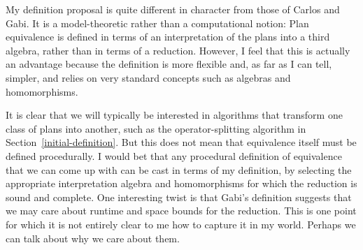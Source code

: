 My definition proposal is quite different in character from those of
Carlos and Gabi. It is a model-theoretic rather than a computational
notion: Plan equivalence is defined in terms of an interpretation of
the plans into a third algebra, rather than in terms of a reduction.
However, I feel that this is actually an advantage because the
definition is more flexible and, as far as I can tell, simpler, and
relies on very standard concepts such as algebras and homomorphisms.

It is clear that we will typically be interested in algorithms that
transform one class of plans into another, such as the
operator-splitting algorithm in Section~\ref{initial-definition}.  But
this does not mean that equivalence itself must be defined
procedurally.  I would bet that any procedural definition of
equivalence that we can come up with can be cast in terms of my
definition, by selecting the appropriate interpretation algebra and
homomorphisms for which the reduction is sound and complete.  One
interesting twist is that Gabi's definition suggests that we may care
about runtime and space bounds for the reduction.  This is one point
for which it is not entirely clear to me how to capture it in my
world.  Perhaps we can talk about why we care about them.



